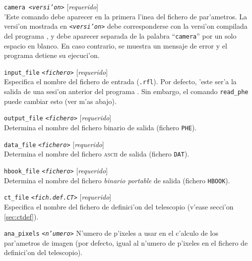 \begin{Uentry}
  
\item[\texttt{camera <\emph{versi'on}>}]
%
  [\emph{requerido}] \\
  'Este comando debe aparecer en la primera l'inea del fichero de
  par'ametros.  La versi'on mostrada en \texttt{<\emph{versi'on}>}
  debe corresponderse con la versi'on compilada del programa \camera,
  y debe aparecer separada de la palabra ``\texttt{camera}'' por un
  solo espacio en blanco.  En caso contrario, se muestra un mensaje de
  error y el programa detiene su ejecuci'on.
  
\item[\texttt{input\_file} \quad
  \texttt{<\emph{fichero}>}]
%
  [\emph{requerido}] \\
  Especifica el nombre del fichero de entrada (\texttt{.rfl}).  Por
  defecto, 'este ser'a la salida de una sesi'on anterior del programa
  .  Sin embargo, el comando \texttt{read\_phe} puede
  cambiar esto (ver m'as abajo).
     

\item[\texttt{output\_file} \quad
  \texttt{<\emph{fichero}>}]    
%
  [\emph{requerido}] \\
  Determina el nombre del fichero binario de salida (fichero \texttt{PHE}).

\item[\texttt{data\_file} \quad
  \texttt{<\emph{fichero}>}]
%
  [\emph{requerido}] \\
  Determina el nombre del fichero \textsc{ascii} de salida (fichero
  \texttt{DAT}).

\item[\texttt{hbook\_file} \quad
  \texttt{<\emph{fichero}>}]
%
  [\emph{requerido}] \\
  Determina el nombre del fichero \emph{binario portable} de salida
  (fichero \texttt{HBOOK}).

\item[\texttt{ct\_file} \quad
  \texttt{<\emph{fich.def.CT}>}]
%
  [\emph{requerido}] \\
  Especifica el nombre del fichero de definici'on del telescopio
  (v'ease secci'on \ref{sec:ctdef}).

\item[\texttt{ana\_pixels} \quad
  \texttt{<\emph{n'umero}>}]
%
  N'umero de p'ixeles a usar en el c'alculo de los par'ametros de
  imagen (por defecto, igual al n'umero de p'ixeles en el fichero de
  definici'on del telescopio).


\end{Uentry}
